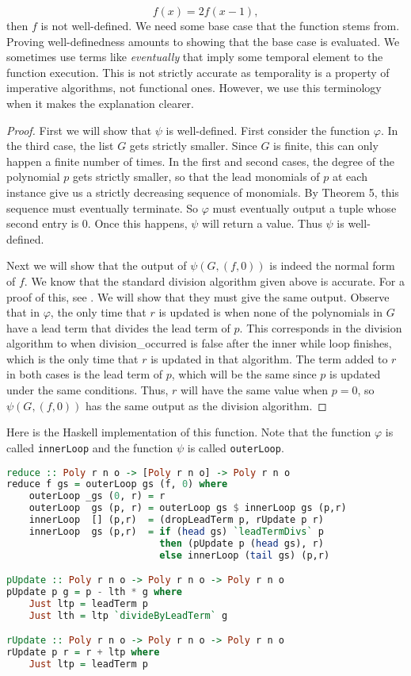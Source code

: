 \documentclass[MS, xcolor=dvipsnames]{wfuthesis}
\theoremstyle{definition}
\def\p{\varphi}
\begin{document}
\[ f(x) = 2f(x-1), \]
then $f$ is not well-defined. We need some base case that the function stems from. Proving well-definedness amounts to showing that the base case is evaluated. We sometimes use terms like \emph{eventually} that imply some temporal element to the function execution. This is not strictly accurate as temporality is a property of imperative algorithms, not functional ones. However, we use this terminology when it makes the explanation clearer. 
\begin{proof}
  First we will show that $\psi$ is well-defined. First consider the function $\p$. In the third case, the list $G$ gets strictly smaller. Since $G$ is finite, this can only happen a finite number of times. In the first and second cases, the degree of the polynomial $p$ gets strictly smaller, so that the lead monomials of $p$ at each instance give us a strictly decreasing sequence of monomials. By Theorem 5, this sequence must eventually terminate. So $\p$ must eventually output a tuple whose second entry is 0. Once this happens, $\psi$ will return a value. Thus $\psi$ is well-defined. \par 
  Next we will show that the output of $\psi(G,(f,0))$ is indeed the normal form of $f$. We know that the standard division algorithm given above is accurate. For a proof of this, see \cite{Cox2015}. We will show that they must give the same output. Observe that in $\p$, the only time that $r$ is updated is when none of the polynomials in $G$ have a lead term that divides the lead term of $p$. This corresponds in the division algorithm to when division\_occurred is false after the inner while loop finishes, which is the only time that $r$ is updated in that algorithm. The term added to $r$ in both cases is the lead term of $p$, which will be the same since $p$ is updated under the same conditions. Thus, $r$ will have the same value when $p=0$, so $\psi(G,(f,0))$ has the same output as the division algorithm. 
\end{proof}
Here is the Haskell implementation of this function. Note that the function $\p$ is called \lstinline{innerLoop} and the function $\psi$ is called \lstinline{outerLoop}. 
\begin{lstlisting}[language=Haskell]
reduce :: Poly r n o -> [Poly r n o] -> Poly r n o
reduce f gs = outerLoop gs (f, 0) where
    outerLoop _gs (0, r) = r
    outerLoop  gs (p, r) = outerLoop gs $ innerLoop gs (p,r)
    innerLoop  [] (p,r)  = (dropLeadTerm p, rUpdate p r)
    innerLoop  gs (p,r)  = if (head gs) `leadTermDivs` p
                           then (pUpdate p (head gs), r)
                           else innerLoop (tail gs) (p,r)

pUpdate :: Poly r n o -> Poly r n o -> Poly r n o
pUpdate p g = p - lth * g where
    Just ltp = leadTerm p
    Just lth = ltp `divideByLeadTerm` g

rUpdate :: Poly r n o -> Poly r n o -> Poly r n o
rUpdate p r = r + ltp where
    Just ltp = leadTerm p
\end{lstlisting}
\end{document}
